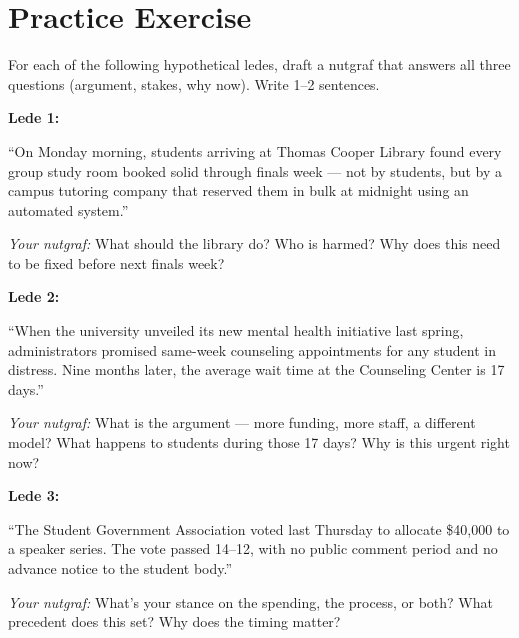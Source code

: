 \documentclass[12pt]{article}
\begin{document}
\newpage
\section*{Practice Exercise}

For each of the following hypothetical ledes, draft a nutgraf that answers all three questions (argument, stakes, why now). Write 1--2 sentences.

\begin{promptbox}
\textbf{Lede 1:}

``On Monday morning, students arriving at Thomas Cooper Library found every group study room booked solid through finals week --- not by students, but by a campus tutoring company that reserved them in bulk at midnight using an automated system.''

\textit{Your nutgraf:} What should the library do? Who is harmed? Why does this need to be fixed before next finals week?
\end{promptbox}

\begin{promptbox}
\textbf{Lede 2:}

``When the university unveiled its new mental health initiative last spring, administrators promised same-week counseling appointments for any student in distress. Nine months later, the average wait time at the Counseling Center is 17 days.''

\textit{Your nutgraf:} What is the argument --- more funding, more staff, a different model? What happens to students during those 17 days? Why is this urgent right now?
\end{promptbox}

\begin{promptbox}
\textbf{Lede 3:}

``The Student Government Association voted last Thursday to allocate \$40,000 to a speaker series. The vote passed 14--12, with no public comment period and no advance notice to the student body.''

\textit{Your nutgraf:} What's your stance on the spending, the process, or both? What precedent does this set? Why does the timing matter?
\end{promptbox}
\end{document}
